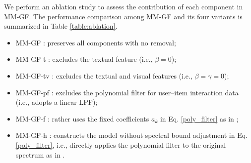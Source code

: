 \documentclass[a4paper,fleqn]{cas-sc}
\renewcommand{\cite}{\citep}
\begin{document}
We perform an ablation study to assess the contribution of each component in \textsf{MM-GF}. The performance comparison among \textsf{MM-GF} and its four variants is summarized in Table \ref{table:ablation}.
\begin{itemize}
    \item \textsf{MM-GF} : preserves all components with no removal;
    \item \textsf{MM-GF-t} : excludes the textual feature (i.e., $\beta = 0$);
    \item \textsf{MM-GF-tv} : excludes the textual and visual features (i.e., $ \beta = \gamma = 0$);
    \item \textsf{MM-GF-pf} : excludes the polynomial filter for user--item interaction data (i.e., adopts a linear LPF);
    \item \textsf{MM-GF-f} : rather uses the fixed coefficients $a_k$ in Eq. \eqref{poly_filter} as in \cite{DBLP:conf/sigir/ParkSS24, DBLP:conf/www/ParkYS25, DBLP:conf/www/KimCPS25};
    \item \textsf{MM-GF-h} : constructs the model without spectral bound adjustment in Eq. \eqref{poly_filter}, i.e., directly applies the polynomial filter to the original spectrum as in \cite{DBLP:conf/sigir/ParkSS24, DBLP:conf/www/ParkYS25, DBLP:conf/www/KimCPS25}.
\end{itemize}





\end{document}
